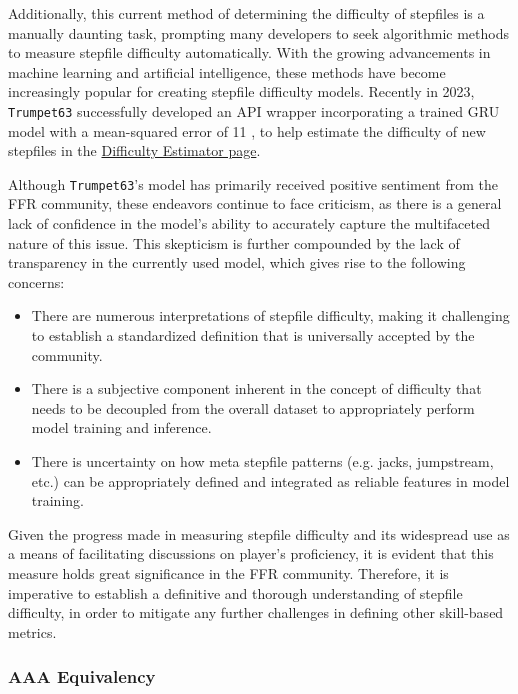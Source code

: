 Additionally, this current method of determining the difficulty of stepfiles is a manually daunting task, prompting many developers to seek algorithmic methods to measure stepfile difficulty automatically. With the growing advancements in machine learning and artificial intelligence, these methods have become increasingly popular for creating stepfile difficulty models. Recently in 2023, \texttt{Trumpet63} successfully developed an API wrapper incorporating a trained GRU model with a mean-squared error of 11 \cite{20230216}, to help estimate the difficulty of new stepfiles in the \href{https://www.flashflashrevolution.com/~velocity/ffrjs/difficulty/}{Difficulty Estimator page}.

\vspace{2mm}

Although \texttt{Trumpet63}’s model has primarily received positive sentiment from the FFR community, these endeavors continue to face criticism, as there is a general lack of confidence in the model’s ability to accurately capture the multifaceted nature of this issue. This skepticism is further compounded by the lack of transparency in the currently used model, which gives rise to the following concerns:

\begin{itemize}
	\item There are numerous interpretations of stepfile difficulty, making it challenging to establish a standardized definition that is universally accepted by the community.
	\item There is a subjective component inherent in the concept of difficulty that needs to be decoupled from the overall dataset to appropriately perform model training and inference.
	\item There is uncertainty on how meta stepfile patterns (e.g. jacks, jumpstream, etc.) can be appropriately defined and integrated as reliable features in model training. 
\end{itemize}

Given the progress made in measuring stepfile difficulty and its widespread use as a means of facilitating discussions on player's proficiency, it is evident that this measure holds great significance in the FFR community. Therefore, it is imperative to establish a definitive and thorough understanding of stepfile difficulty, in order to mitigate any further challenges in defining other skill-based metrics.

\subsubsection{AAA Equivalency}

